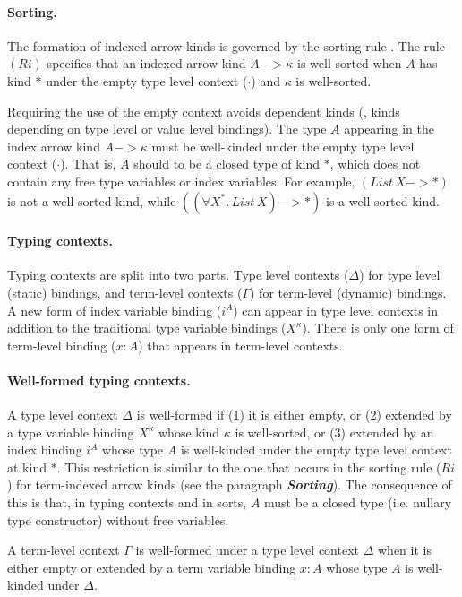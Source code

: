 \paragraph{Sorting.} \label{sorting}
The formation of indexed arrow kinds is
governed by the sorting rule . The rule $(Ri)$ specifies that
an indexed arrow kind $A -> \kappa$ is well-sorted when $A$ has kind $*$
under the empty type level context ($\cdot$) and $\kappa$ is well-sorted.

Requiring the use of the empty context avoids dependent kinds (\ie, kinds depending on type level or value level
bindings). The type $A$ appearing in
the index arrow kind $A -> \kappa$ must be well-kinded under
the empty type level context ($\cdot$).
That is, $A$ should to be a closed type of kind $*$,
which does not contain any free type variables or index variables.
For example, $(\textit{List}\,X -> *)$ is not a well-sorted kind,
while $((\forall X^{*}\!.\,\textit{List}\,X) -> *)$ is a well-sorted kind.

\paragraph{Typing contexts.}
Typing contexts are split into two parts.
Type level contexts ($\Delta$) for type level (static) bindings,
and term-level contexts ($\Gamma$) for term-level (dynamic) bindings.
A new form of index variable binding ($i^A$) can appear in
type level contexts in addition to the traditional type variable bindings ($X^\kappa$).
There is only one form of term-level binding ($x:A$) that appears in
term-level contexts.

\paragraph{Well-formed typing contexts.}
A type level context $\Delta$ is well-formed if (1) it is either empty,
or (2) extended by a type variable binding $X^\kappa$ whose kind $\kappa$ is
well-sorted, or (3) extended by an index binding $i^A$ whose type $A$ is
well-kinded under the empty type level context at kind $*$.
This restriction is similar to the one that occurs in the sorting rule ($Ri$)
for term-indexed arrow kinds (see the paragraph {\bf\textit{Sorting}}).
The consequence of this is that, in typing contexts and in sorts, $A$ must be
a closed type (i.e. nullary type constructor) without free variables.

A term-level context $\Gamma$ is well-formed under a type level context
$\Delta$ when it is either empty or extended by a term variable binding
$x:A$ whose type $A$ is well-kinded under $\Delta$.


